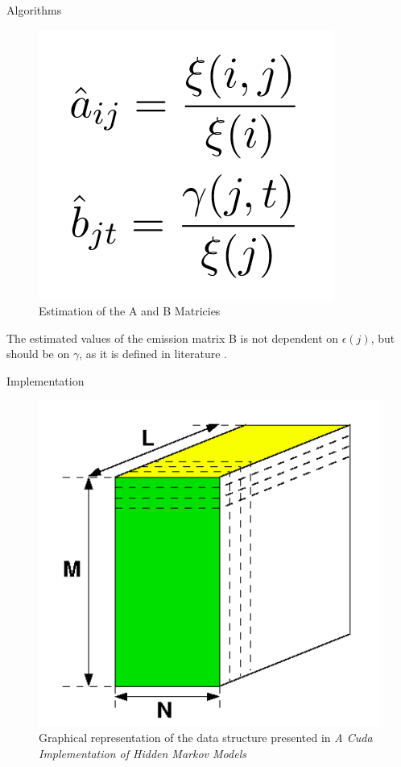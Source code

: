 \documentclass[11pt]{beamer}
\begin{document}
\begin{frame}{Algorithms}
\begin{figure}[H]

\centering
\includegraphics[scale=0.4]{"estimation"}
 \caption{Estimation of the A and B Matricies \cite{cuhmm}}

\end{figure}

The estimated values of the emission matrix B is not dependent on \(\epsilon(j)\), but should be on \(\gamma\), as it is defined in literature \cite{hmm}. 
\end{frame}

\begin{frame}{Implementation}
\begin{figure}[H]
\centering

\includegraphics[scale=0.2]{"3d_trellis"}
  \caption{Graphical representation of the data structure presented in \textit{A Cuda Implementation of Hidden Markov Models}\cite{cuhmm}}
\end{figure}
\end{frame}
\end{document}
